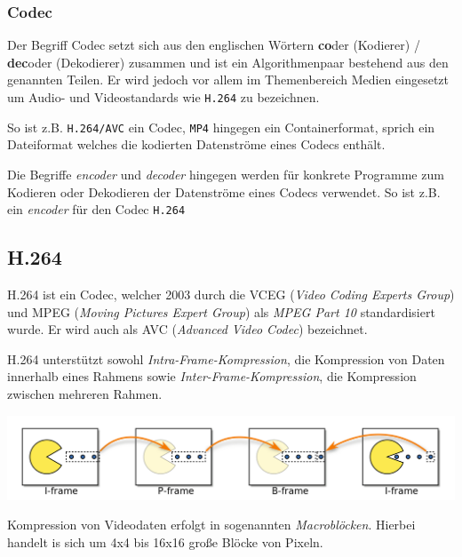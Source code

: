 \subsubsection{Codec}
Der Begriff Codec setzt sich aus den englischen Wörtern \textbf{co}der (Kodierer) / \textbf{dec}oder (Dekodierer)
zusammen und ist ein Algorithmenpaar bestehend aus den genannten Teilen.
Er wird jedoch vor allem im Themenbereich Medien eingesetzt um Audio- und Videostandards wie \texttt{H.264} zu
bezeichnen.

\noindent\newline So ist z.B. \texttt{H.264/AVC} ein Codec, \texttt{MP4} hingegen ein Containerformat, sprich ein Dateiformat welches
die kodierten Datenströme eines Codecs enthält.

\noindent\newline Die Begriffe \textit{encoder} und \textit{decoder} hingegen werden für konkrete Programme zum Kodieren oder Dekodieren
der Datenströme eines Codecs verwendet.
So ist z.B.  ein \textit{encoder} für den Codec \texttt{H.264}

\subsection{H.264}\label{subsec:h.264}
H.264 ist ein Codec, welcher 2003 durch die VCEG (\textit{Video Coding Experts Group}) und MPEG
(\textit{Moving Pictures Expert Group}) als \textit{MPEG Part 10} standardisiert wurde.
Er wird auch als AVC (\textit{Advanced Video Codec}) bezeichnet.

\noindent\newline H.264 unterstützt sowohl \textit{Intra-Frame-Kompression}, die Kompression von Daten innerhalb eines Rahmens sowie
\textit{Inter-Frame-Kompression}, die Kompression zwischen mehreren Rahmen.

\noindent\newline\includegraphics[width=\textwidth]{../img/frames}

\noindent\newline Kompression von Videodaten erfolgt in sogenannten \textit{Macroblöcken}.
Hierbei handelt is sich um 4x4 bis 16x16 große Blöcke von Pixeln.

